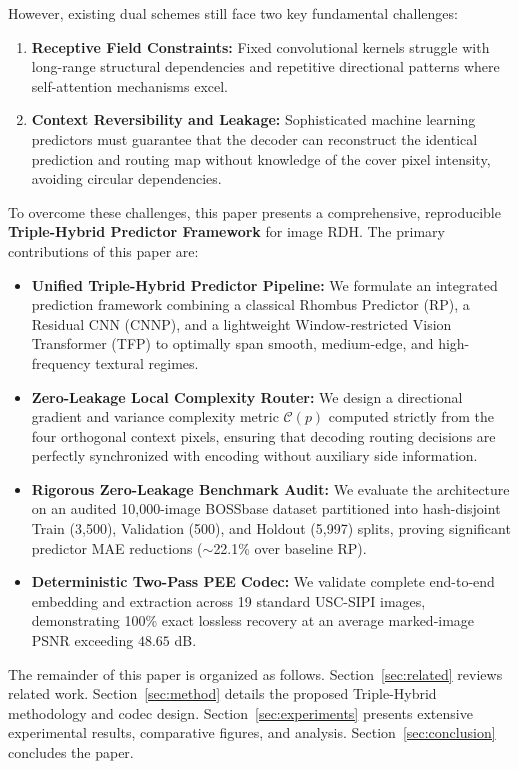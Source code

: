\documentclass[conference]{IEEEtran}
\begin{document}
However, existing dual schemes still face two key fundamental challenges:
\begin{enumerate}
    \item \textbf{Receptive Field Constraints:} Fixed convolutional kernels struggle with long-range structural dependencies and repetitive directional patterns where self-attention mechanisms excel.
    \item \textbf{Context Reversibility and Leakage:} Sophisticated machine learning predictors must guarantee that the decoder can reconstruct the identical prediction and routing map without knowledge of the cover pixel intensity, avoiding circular dependencies.
\end{enumerate}

To overcome these challenges, this paper presents a comprehensive, reproducible \textbf{Triple-Hybrid Predictor Framework} for image RDH. The primary contributions of this paper are:
\begin{itemize}
    \item \textbf{Unified Triple-Hybrid Predictor Pipeline:} We formulate an integrated prediction framework combining a classical Rhombus Predictor (RP), a Residual CNN (CNNP), and a lightweight Window-restricted Vision Transformer (TFP) to optimally span smooth, medium-edge, and high-frequency textural regimes.
    \item \textbf{Zero-Leakage Local Complexity Router:} We design a directional gradient and variance complexity metric $\mathcal{C}(p)$ computed strictly from the four orthogonal context pixels, ensuring that decoding routing decisions are perfectly synchronized with encoding without auxiliary side information.
    \item \textbf{Rigorous Zero-Leakage Benchmark Audit:} We evaluate the architecture on an audited 10,000-image BOSSbase dataset partitioned into hash-disjoint Train (3,500), Validation (500), and Holdout (5,997) splits, proving significant predictor MAE reductions ($\sim$22.1\% over baseline RP).
    \item \textbf{Deterministic Two-Pass PEE Codec:} We validate complete end-to-end embedding and extraction across 19 standard USC-SIPI images, demonstrating 100\% exact lossless recovery at an average marked-image PSNR exceeding $48.65$ dB.
\end{itemize}

The remainder of this paper is organized as follows. Section~\ref{sec:related} reviews related work. Section~\ref{sec:method} details the proposed Triple-Hybrid methodology and codec design. Section~\ref{sec:experiments} presents extensive experimental results, comparative figures, and analysis. Section~\ref{sec:conclusion} concludes the paper.
\end{document}
